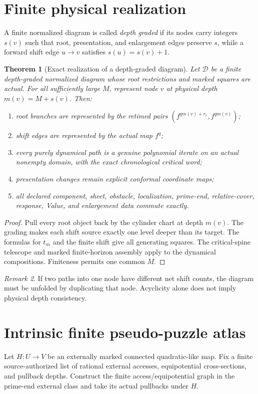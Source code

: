 \documentclass[11pt]{article}
\newtheorem{theorem}{Theorem}[section]
\theoremstyle{definition}
\theoremstyle{remark}
\newtheorem{remark}[theorem]{Remark}
\begin{document}
\section{Finite physical realization}
A finite normalized diagram is called \emph{depth graded} if its nodes carry
integers $s(v)$ such that root, presentation, and enlargement edges preserve
$s$, while a forward shift edge $u\to v$ satisfies $s(u)=s(v)+1$.

\begin{theorem}[Exact realization of a depth-graded diagram]
Let $\mathcal D$ be a finite depth-graded normalized diagram whose root
restrictions and marked squares are actual.  For all sufficiently large $M$,
represent node $v$ at physical depth $m(v)=M+s(v)$.  Then:
\begin{enumerate}
\item root branches are represented by the retimed pairs
$(f^{qm(v)+r_e},f^{qm(v)})$;
\item shift edges are represented by the actual map $f^q$;
\item every purely dynamical path is a genuine polynomial iterate on an actual
nonempty domain, with the exact chronological critical word;
\item presentation changes remain explicit conformal coordinate maps;
\item all declared component, sheet, obstacle, localization, prime-end,
relative-cover, response, Value, and enlargement data commute exactly.
\end{enumerate}
\end{theorem}

\begin{proof}
Pull every root object back by the cylinder chart at depth $m(v)$.  The grading
makes each shift source exactly one level deeper than its target.  The formulas
for $t_m$ and the finite shift give all generating squares.  The critical-spine
telescope and marked finite-horizon assembly apply to the dynamical
compositions.  Finiteness permits one common $M$.
\end{proof}

\begin{remark}
If two paths into one node have different net shift counts, the diagram must be
unfolded by duplicating that node.  Acyclicity alone does not imply physical
depth consistency.
\end{remark}

\section{Intrinsic finite pseudo-puzzle atlas}
Let $H:U\to V$ be an externally marked connected quadratic-like map.  Fix a
finite source-authorized list of rational external accesses, equipotential
cross-sections, and pullback depths.  Construct the finite access/equipotential
graph in the prime-end external class and take its actual pullbacks under $H$.
\end{document}
